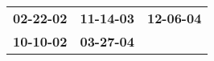 \begin{supertabular}{p{0.33\columnwidth}p{0.33\columnwidth}p{0.33\columnwidth}}
 \textbf{02-22-02\textsuperscript{}} &  \textbf{11-14-03\textsuperscript{}} &  \textbf{12-06-04\textsuperscript{}} \\
 \textbf{10-10-02\textsuperscript{}} &  \textbf{03-27-04\textsuperscript{}} &                                      \\
\end{supertabular}

